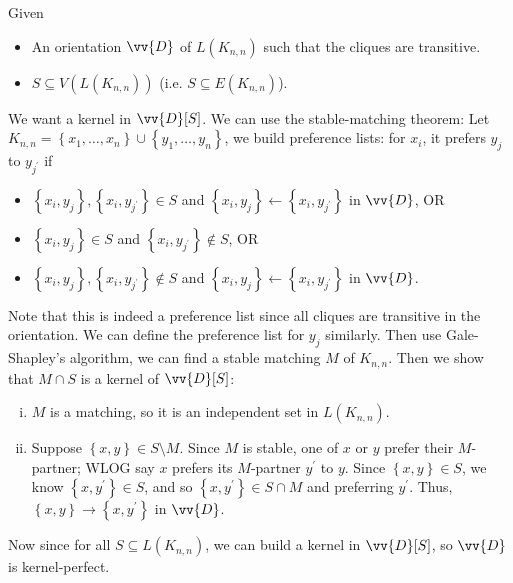 \begin{explanation}
    Given 
    \begin{itemize}
        \item An orientation \(\vv{D}\) of \(L(K_{n, n})\) such that the cliques are transitive. 
        \item \(S \subseteq V(L(K_{n, n}))\) (i.e. \(S \subseteq E(K_{n, n})\)).   
    \end{itemize}
    We want a kernel in \(\vv{D}[S]\). We can use the stable-matching theorem: Let \(K_{n, n} = \left\{ x_1, \dots , x_n \right\} \cup \left\{ y_1, \dots , y_n \right\} \), we build preference lists: for \(x_i\), it prefers \(y_j\) to \(y_{j^{\prime} }\) if 
    \begin{itemize}
        \item \(\left\{ x_i, y_j \right\}, \left\{ x_i, y_{j^{\prime} } \right\} \in S  \) and \(\left\{ x_i, y_j \right\} \leftarrow \left\{ x_i, y_{j^{\prime} } \right\}  \) in \(\vv{D}\), OR 
        \item \(\left\{ x_i, y_j \right\} \in S\) and \(\left\{ x_i, y_{j^{\prime} } \right\} \notin S \), OR 
        \item \(\left\{ x_i, y_j \right\}, \left\{ x_i, y_{j^{\prime}}  \right\} \notin S  \) and \(\left\{ x_i, y_j \right\} \leftarrow \left\{ x_i, y_{j^{\prime} } \right\}   \) in \(\vv{D}\).  
    \end{itemize}
    Note that this is indeed a preference list since all cliques are transitive in the orientation. We can define the preference list for \(y_j\) similarly. Then use Gale-Shapley's algorithm, we can find a stable matching \(M\) of \(K_{n, n}\). Then we show that \(M \cap S\) is a kernel of \(\vv{D} [S]\):
    \begin{enumerate}[(i)]
        \item \(M\) is a matching, so it is an independent set in \(L(K_{n, n})\). 
        \item Suppose \(\left\{ x, y \right\} \in S \setminus M \). Since \(M\) is stable, one of \(x\) or \(y\) prefer their \(M\)-partner; WLOG say \(x\) prefers its \(M\)-partner \(y^{\prime} \) to \(y\). Since \(\left\{ x, y \right\} \in S \), we know \(\left\{ x, y^{\prime}  \right\} \in S \), and so \(\left\{ x, y^{\prime}  \right\} \in S \cap M \) and preferring \(y^{\prime} \). Thus, \(\left\{ x, y \right\} \to \left\{ x, y^{\prime}  \right\}   \) in \(\vv{D}\).                
    \end{enumerate} 
    Now since for all \(S \subseteq L(K_{n, n})\), we can build a kernel in \(\vv{D}[S]\), so \(\vv{D}\) is kernel-perfect.  
\end{explanation}